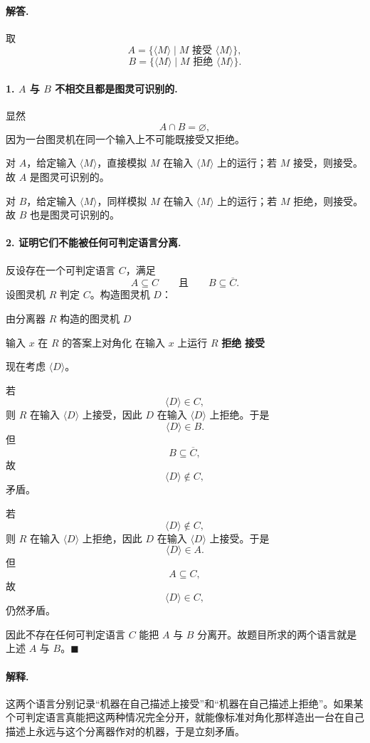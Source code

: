 \begin{answerred}
\paragraph{解答.}
取
\[
A=\{\langle M\rangle\mid M \text{ 接受 } \langle M\rangle\},
\]
\[
B=\{\langle M\rangle\mid M \text{ 拒绝 } \langle M\rangle\}.
\]

\paragraph{1. \(A\) 与 \(B\) 不相交且都是图灵可识别的.}
显然
\[
A\cap B=\varnothing,
\]
因为一台图灵机在同一个输入上不可能既接受又拒绝。

对 $A$，给定输入 $\langle M\rangle$，直接模拟 $M$ 在输入 $\langle M\rangle$ 上的运行；若 $M$ 接受，则接受。故 $A$ 是图灵可识别的。

对 $B$，给定输入 $\langle M\rangle$，同样模拟 $M$ 在输入 $\langle M\rangle$ 上的运行；若 $M$ 拒绝，则接受。故 $B$ 也是图灵可识别的。

\paragraph{2. 证明它们不能被任何可判定语言分离.}
反设存在一个可判定语言 $C$，满足
\[
A\subseteq C
\qquad\text{且}\qquad
B\subseteq \overline C.
\]
设图灵机 $R$ 判定 $C$。构造图灵机 $D$：

\begin{myalgo}{由分离器 $R$ 构造的图灵机 $D$}
\begin{algorithmic}[1]
  \Require 输入 $x$
  \Ensure 在 $R$ 的答案上对角化
  \State 在输入 $x$ 上运行 $R$
    \State \textbf{拒绝}
  \Else
    \State \textbf{接受}
  \EndIf
\end{algorithmic}
\end{myalgo}

现在考虑 $\langle D\rangle$。

\medskip
若
\[
\langle D\rangle\in C,
\]
则 $R$ 在输入 $\langle D\rangle$ 上接受，因此 $D$ 在输入 $\langle D\rangle$ 上拒绝。于是
\[
\langle D\rangle\in B.
\]
但
\[
B\subseteq \overline C,
\]
故
\[
\langle D\rangle\notin C,
\]
矛盾。

\medskip
若
\[
\langle D\rangle\notin C,
\]
则 $R$ 在输入 $\langle D\rangle$ 上拒绝，因此 $D$ 在输入 $\langle D\rangle$ 上接受。于是
\[
\langle D\rangle\in A.
\]
但
\[
A\subseteq C,
\]
故
\[
\langle D\rangle\in C,
\]
仍然矛盾。

\medskip
因此不存在任何可判定语言 $C$ 能把 $A$ 与 $B$ 分离开。故题目所求的两个语言就是上述 $A$ 与 $B$。$\blacksquare$

\begin{answernote}
\paragraph{解释.}
这两个语言分别记录“机器在自己描述上接受”和“机器在自己描述上拒绝”。如果某个可判定语言真能把这两种情况完全分开，就能像标准对角化那样造出一台在自己描述上永远与这个分离器作对的机器，于是立刻矛盾。

\end{answernote}
\end{answerred}
